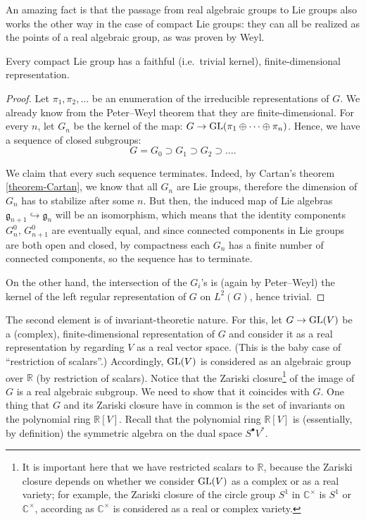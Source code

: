 An amazing fact is that the passage from real algebraic groups to Lie groups also works the other way in the case of compact Lie groups: they can all be realized as the points of a real algebraic group, as was proven by Weyl. 


\begin{proposition}
\label{proposition-compact-faithfulrep}
 Every compact Lie group has a faithful (i.e.\ trivial kernel), finite-dimensional representation.
\end{proposition}

\begin{proof}
 Let $\pi_1,\pi_2,\dots$ be an enumeration of the irreducible representations of $G$. We already know from the Peter--Weyl theorem that they are finite-dimensional. For every $n$, let $G_n$ be the kernel of the map: $G\to {\rm GL}(\pi_1\oplus\dots\oplus \pi_n)$. Hence, we have a sequence of closed subgroups:
$$ G=G_0\supset G_1\supset G_2\supset \dots.$$

We claim that every such sequence terminates. Indeed, by Cartan's theorem \ref{theorem-Cartan}, we know that all $G_n$ are Lie groups, therefore the dimension of $G_n$ has to stabilize after some $n$. But then, the induced map of Lie algebras $\mathfrak g_{n+1}\hookrightarrow \mathfrak g_n$ will be an isomorphism, which means that the identity components $G_n^0$, $G_{n+1}^0$ are eventually equal, and since connected components in Lie groups are both open and closed, by compactness each $G_n$ has a finite number of connected components, so the sequence has to terminate.

On the other hand, the intersection of the $G_i$'s is (again by Peter--Weyl) the kernel of the left regular representation of $G$ on $L^2(G)$, hence trivial.
\end{proof}

The second element is of invariant-theoretic nature. For this, let $G\to {\rm GL}(V)$ be a (complex), finite-dimensional representation of $G$ and consider it as a real representation by regarding $V$ as a real vector space. (This is the baby case of ``restriction of scalars''.) Accordingly, ${\rm GL}(V)$ is considered as an algebraic group over $\mathbb R$ (by restriction of scalars). Notice that the Zariski closure\footnote{It is important here that we have restricted scalars to $\mathbb R$, because the Zariski closure depends on whether we consider ${\rm GL}(V)$ as a complex or as a real variety; for example, the Zariski closure of the circle group $S^1$ in $\mathbb C^\times$ is $S^1$ or $\mathbb C^\times$, according as $\mathbb C^\times$ is considered as a real or complex variety.} of the image of $G$ is a real algebraic subgroup. We need to show that it coincides with $G$. One thing that $G$ and its Zariski closure have in common is the set of invariants on the polynomial ring $\mathbb R[V]$. Recall that the polynomial ring $\mathbb R[V]$ is (essentially, by 
definition) the symmetric algebra on the dual space $S^\bullet V^*$.


